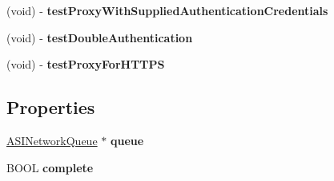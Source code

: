\begin{DoxyCompactItemize}
\item 
\hypertarget{interface_proxy_tests_a51146a296d58652cdf040a0e36c39d96}{
(void) -\/ {\bfseries test\-Proxy\-With\-Supplied\-Authentication\-Credentials}}
\label{interface_proxy_tests_a51146a296d58652cdf040a0e36c39d96}

\item 
\hypertarget{interface_proxy_tests_a37018a3f1cce212ab02d59150bf021fc}{
(void) -\/ {\bfseries test\-Double\-Authentication}}
\label{interface_proxy_tests_a37018a3f1cce212ab02d59150bf021fc}

\item 
\hypertarget{interface_proxy_tests_aa344ec9954815b1d25a1d9d60ce5136c}{
(void) -\/ {\bfseries test\-Proxy\-For\-H\-T\-T\-P\-S}}
\label{interface_proxy_tests_aa344ec9954815b1d25a1d9d60ce5136c}

\end{DoxyCompactItemize}
\subsection*{\-Properties}
\begin{DoxyCompactItemize}
\item 
\hypertarget{interface_proxy_tests_aee1afd95b23b880bb4a9dd8ddd035be3}{
\hyperlink{interface_a_s_i_network_queue}{\-A\-S\-I\-Network\-Queue} $\ast$ {\bfseries queue}}
\label{interface_proxy_tests_aee1afd95b23b880bb4a9dd8ddd035be3}

\item 
\hypertarget{interface_proxy_tests_a330b6ec1d6b6b1a065b8948ed649e3ef}{
\-B\-O\-O\-L {\bfseries complete}}
\label{interface_proxy_tests_a330b6ec1d6b6b1a065b8948ed649e3ef}

\end{DoxyCompactItemize}


